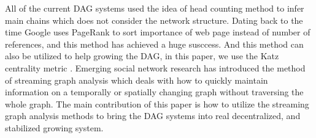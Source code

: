 All of the current DAG systems used the idea of head counting method to infer main chains which does not consider the network structure.
Dating back to the time Google uses PageRank \cite{page1999pagerank} to sort importance of web page instead of number of references, and this method has achieved a huge susccess.
And this method can also be utilized to help growing the DAG, in this paper, we use the Katz centrality metric \cite{katz1953new}.
Emerging social network research has introduced the method of streaming graph analysis \cite{ediger2011tracking, green2012fast, ediger2012stinger} which deals
with how to quickly maintain information on a temporally or spatially changing graph without traversing the whole graph. 
The main contribution of this paper is how to utilize the streaming graph analysis methods to bring the DAG systems into real decentralized, and stabilized growing system.
